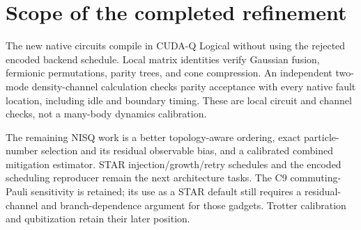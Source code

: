 \documentclass[11pt]{article}
\begin{document}
\section{Scope of the completed refinement}
The new native circuits compile in CUDA-Q Logical without using the rejected
encoded backend schedule. Local matrix identities verify Gaussian fusion,
fermionic permutations, parity trees, and cone compression. An independent
two-mode density-channel calculation checks parity acceptance with every native
fault location, including idle and boundary timing. These are local circuit
and channel checks, not a many-body dynamics calibration.

The remaining NISQ work is a better topology-aware ordering, exact
particle-number selection and its residual observable bias, and a calibrated
combined mitigation estimator. STAR injection/growth/retry schedules and the
encoded scheduling reproducer remain the next architecture tasks. The C9
commuting-Pauli sensitivity is retained; its use as a STAR default still
requires a residual-channel and branch-dependence argument for those gadgets.
Trotter calibration and qubitization retain their later position.



\end{document}
